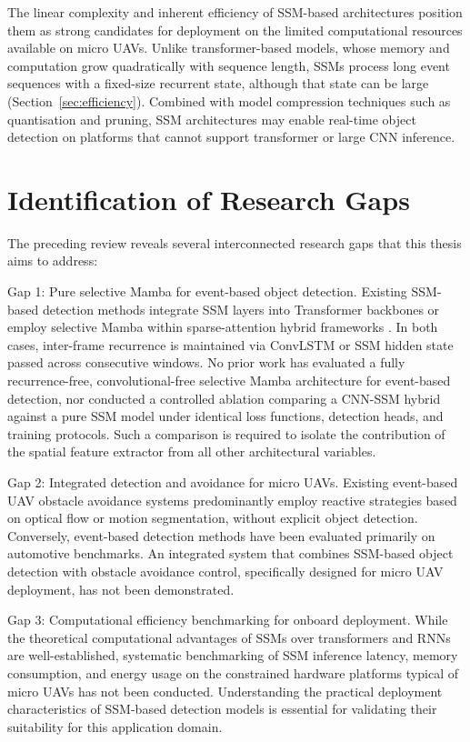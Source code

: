 \documentclass[11pt, a4paper]{report}
\begin{document}
The linear complexity and inherent efficiency of SSM-based architectures position them as strong candidates for deployment on the limited computational resources available on micro UAVs. Unlike transformer-based models, whose memory and computation grow quadratically with sequence length, SSMs process long event sequences with a fixed-size recurrent state, although that state can be large (Section~\ref{sec:efficiency}). Combined with model compression techniques such as quantisation and pruning, SSM architectures may enable real-time object detection on platforms that cannot support transformer or large CNN inference. 

\section{Identification of Research Gaps}
\label{sec:gaps_thesisA}
The preceding review reveals several interconnected research gaps that this thesis aims to address: 

Gap 1: Pure selective Mamba for event-based object detection. Existing SSM-based detection methods integrate SSM layers into Transformer backbones \cite{zubic2024state} or employ selective Mamba within sparse-attention hybrid frameworks \cite{yang2025smamba}. In both cases, inter-frame recurrence is maintained via ConvLSTM or SSM hidden state passed across consecutive windows. No prior work has evaluated a fully recurrence-free, convolutional-free selective Mamba architecture for event-based detection, nor conducted a controlled ablation comparing a CNN-SSM hybrid against a pure SSM model under identical loss functions, detection heads, and training protocols. Such a comparison is required to isolate the contribution of the spatial feature extractor from all other architectural variables. 

Gap 2: Integrated detection and avoidance for micro UAVs. Existing event-based UAV obstacle avoidance systems \cite{falanga2020dynamic, sanket2020evdodgenet} predominantly employ reactive strategies based on optical flow or motion segmentation, without explicit object detection. Conversely, event-based detection methods \cite{perot2020learning,gehrig2023recurrent} have been evaluated primarily on automotive benchmarks. An integrated system that combines SSM-based object detection with obstacle avoidance control, specifically designed for micro UAV deployment, has not been demonstrated. 

Gap 3: Computational efficiency benchmarking for onboard deployment. While the theoretical computational advantages of SSMs over transformers and RNNs are well-established, systematic benchmarking of SSM inference latency, memory consumption, and energy usage on the constrained hardware platforms typical of micro UAVs has not been conducted. Understanding the practical deployment characteristics of SSM-based detection models is essential for validating their suitability for this application domain. 
\end{document}
